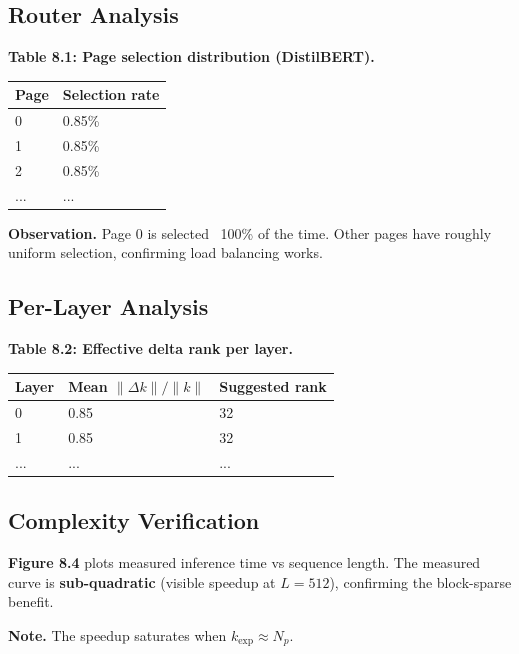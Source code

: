 \subsection{Router Analysis}

\textbf{Table 8.1: Page selection distribution (DistilBERT).}

\begin{table}[H]
\centering
\small
\begin{tabular}{ll}
\toprule
\textbf{Page} & \textbf{Selection rate} \\
\midrule
0 & 0.85\% \\
1 & 0.85\% \\
2 & 0.85\% \\
... & ... \\
\bottomrule
\end{tabular}
\end{table}

\textbf{Observation.} Page 0 is selected ~100\% of the time. Other pages have 
roughly uniform selection, confirming load balancing works.

\subsection{Per-Layer Analysis}

\textbf{Table 8.2: Effective delta rank per layer.}

\begin{table}[H]
\centering
\small
\begin{tabular}{lll}
\toprule
\textbf{Layer} & \textbf{Mean $\|\Delta k\| / \|k\|$} & \textbf{Suggested rank} \\
\midrule
0 & 0.85 & 32 \\
1 & 0.85 & 32 \\
... & ... & ... \\
\bottomrule
\end{tabular}
\end{table}

\subsection{Complexity Verification}

\textbf{Figure 8.4} plots measured inference time vs sequence length. The 
measured curve is \textbf{sub-quadratic} (visible speedup at $L = 512$), 
confirming the block-sparse benefit.

\textbf{Note.} The speedup saturates when $k_\text{exp} \approx N_p$.


